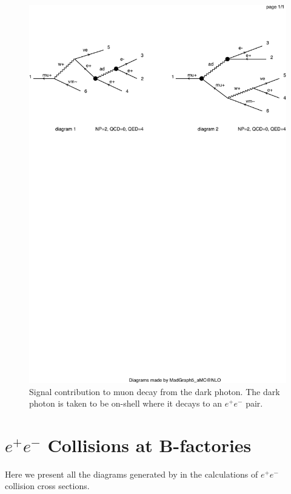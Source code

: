 \begin{figure}[h]
    \centering
    \includegraphics[width=\textwidth,clip=true,viewport=0 500 500 700]{Figures/madgraph_diagrams/mu_eeenunu_darkphoton.pdf}
    \caption[Signal contribution to muon decay from the dark photon.]{Signal contribution to muon decay from the dark photon. The dark photon is taken to be on-shell where it decays to an $e^+ e^-$ pair.}
    \label{fig:mu_eee_darkphoton}
\end{figure}

\section{$e^+ e^-$ Collisions at B-factories}
\label{app:ee_diagrams}
Here we present all the diagrams generated by \madgraph in the calculations of $e^+ e^-$ collision cross sections.

